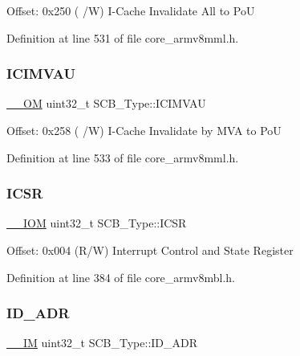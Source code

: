 Offset\+: 0x250 ( /W) I-\/\+Cache Invalidate All to PoU 

Definition at line 531 of file core\+\_\+armv8mml.\+h.

\mbox{\label{struct_s_c_b___type_a5eca5a3e5aedd89a9655df8f5798e2b0}} 
\subsubsection{\texorpdfstring{I\+C\+I\+M\+V\+AU}{ICIMVAU}}
{\footnotesize\ttfamily \hyperlink{core__sc300_8h_a0ea2009ed8fd9ef35b48708280fdb758}{\+\_\+\+\_\+\+OM} uint32\+\_\+t S\+C\+B\+\_\+\+Type\+::\+I\+C\+I\+M\+V\+AU}

Offset\+: 0x258 ( /W) I-\/\+Cache Invalidate by M\+VA to PoU 

Definition at line 533 of file core\+\_\+armv8mml.\+h.

\mbox{\label{struct_s_c_b___type_a0ca18ef984d132c6bf4d9b61cd00f05a}} 
\subsubsection{\texorpdfstring{I\+C\+SR}{ICSR}}
{\footnotesize\ttfamily \hyperlink{core__sc300_8h_ab6caba5853a60a17e8e04499b52bf691}{\+\_\+\+\_\+\+I\+OM} uint32\+\_\+t S\+C\+B\+\_\+\+Type\+::\+I\+C\+SR}

Offset\+: 0x004 (R/W) Interrupt Control and State Register 

Definition at line 384 of file core\+\_\+armv8mbl.\+h.

\mbox{\label{struct_s_c_b___type_aa5c5a6ccc7042927ce3feadc41872aa4}} 
\subsubsection{\texorpdfstring{I\+D\+\_\+\+A\+DR}{ID\_ADR}}
{\footnotesize\ttfamily \hyperlink{core__sc300_8h_a4cc1649793116d7c2d8afce7a4ffce43}{\+\_\+\+\_\+\+IM} uint32\+\_\+t S\+C\+B\+\_\+\+Type\+::\+I\+D\+\_\+\+A\+DR}

